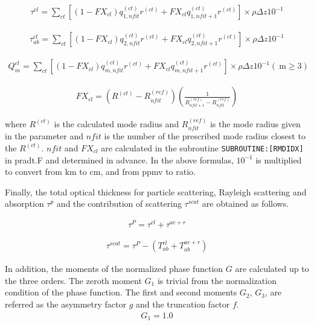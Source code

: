 \begin{eqnarray}
\tau^{c l}=\sum_{c t}\left[\left(1-F X_{c l}\right) q_{1, n f i t}^{(c t)} r^{(c t)}+F X_{c l} q_{1, n f i t+1}^{(c t)} r^{(c t)}\right] \times \rho \Delta z 10^{-1}
\end{eqnarray}

\begin{eqnarray}
\tau_{ab}^{c l}=\sum_{c t}\left[\left(1-F X_{c l}\right) q_{2, n f i t}^{(c t)} r^{(c t)}+F X_{c l} q_{2, n f i t+1}^{(c t)} r^{(c t)}\right] \times \rho \Delta z 10^{-1}
\end{eqnarray}

\begin{eqnarray}
Q_{m}^{c l}=\sum_{c t}\left[\left(1-F X_{c l}\right) q_{m, n f i t}^{(c t)} r^{(c t)}+F X_{c l} q_{m, n f i t+1}^{(c t)} r^{(c t)}\right] \times \rho \Delta z 10^{-1}(\mathrm{~m} \geq 3)
\end{eqnarray}

\begin{eqnarray}
F X_{c l}=\left(R^{(c t)}-R_{n f i t}^{(r e f)}\right)\left(\frac{1}{R_{n f i t+1}^{(r e f)}-R_{n f i t}^{(r e f)}}\right)
\end{eqnarray}

where \(R^{(ct)}\) is the calculated mode radius and \(R_{n f i t}^{(r e f)}\) is the mode radius given in the parameter and \(nfit\) is the number of the prescribed mode radius closest to the
\(R^{(ct)}\). \(nfit\) and \(FX_{cl}\) are calculated in the subroutine \texttt{SUBROUTINE:{[}RMDIDX{]}} in pradt.F and determined in advance. In the above formulas, \(10^{-1}\) is multiplied to
convert from \(\mathrm{km}\) to \(\mathrm{cm}\), and from ppmv to ratio.

Finally, the total optical thickness for particle scattering, Rayleigh scattering and absorption \(\tau^p\) and the contribution of scattering \(\tau^{scat}\) are obtained as follows.

\begin{eqnarray}
\tau^{P}=\tau^{c l}+\tau^{a e+r}
\end{eqnarray}

\begin{eqnarray}
\tau^{s c a t}=\tau^{P}-\left(T_{ab}^{c l}+T_{ab}^{a e+r}\right)
\end{eqnarray}

In addition, the moments of the normalized phase function \(G\) are calculated up to the three orders. The zeroth moment \(G_1\) is trivial from the normalization condition of the phase function. The
first and second moments \(G_2\), \(G_3\), are referred as the asymmetry factor \(g\) and the truncation factor \(f\). \begin{eqnarray}
G_{1}=1.0
\end{eqnarray}

